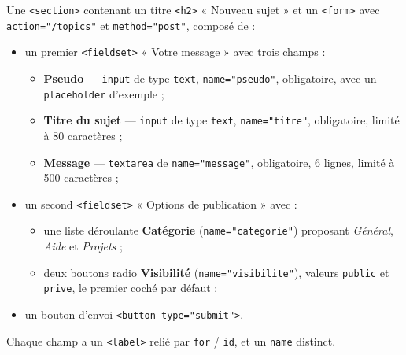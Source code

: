 \documentclass[a4paper,11pt]{article}
\begin{document}
\begin{center}
\end{center}

\begin{tcolorbox}[definition, title={À produire dans \texttt{index.html}}]
Une \texttt{<section>} contenant un titre \texttt{<h2>} « Nouveau sujet » et un \texttt{<form>} avec \texttt{action="/topics"} et \texttt{method="post"}, composé de :
\begin{itemize}
  \item un premier \texttt{<fieldset>} « Votre message » avec trois champs :
  \begin{itemize}
    \item \textbf{Pseudo} --- \texttt{input} de type \texttt{text}, \texttt{name="pseudo"}, obligatoire, avec un \texttt{placeholder} d'exemple ;
    \item \textbf{Titre du sujet} --- \texttt{input} de type \texttt{text}, \texttt{name="titre"}, obligatoire, limité à 80 caractères ;
    \item \textbf{Message} --- \texttt{textarea} de \texttt{name="message"}, obligatoire, 6 lignes, limité à 500 caractères ;
  \end{itemize}
  \item un second \texttt{<fieldset>} « Options de publication » avec :
  \begin{itemize}
    \item une liste déroulante \textbf{Catégorie} (\texttt{name="categorie"}) proposant \textit{Général}, \textit{Aide} et \textit{Projets} ;
    \item deux boutons radio \textbf{Visibilité} (\texttt{name="visibilite"}), valeurs \texttt{public} et \texttt{prive}, le premier coché par défaut ;
  \end{itemize}
  \item un bouton d'envoi \texttt{<button type="submit">}.
\end{itemize}
Chaque champ a un \texttt{<label>} relié par \texttt{for} / \texttt{id}, et un \texttt{name} distinct.
\end{tcolorbox}
\end{document}
